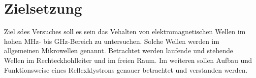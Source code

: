 \section{Zielsetzung}
\label{sec:ziel}
Ziel sdes Versuches soll es sein  das Vehalten von elektromagnetischen Wellen im hohen MHz- 
bis GHz-Bereich zu untersuchen. Solche Wellen werden im allgemeinen Mikrowellen genannt.
Betrachtet werden laufende und stehende Wellen im Rechteckhohlleiter und im freien Raum.
Im weiteren sollen Aufbau und Funktionsweise eines Reflexklystrons genauer betrachtet
und verstanden werden. 
